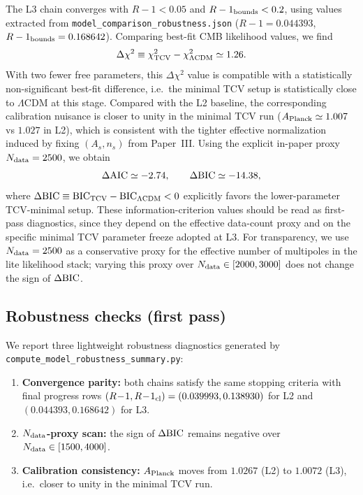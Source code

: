 \documentclass[aps,prd,onecolumn,nofootinbib,superscriptaddress]{revtex4-2}
\begin{document}
The L3 chain converges with $R-1<0.05$ and $R-1_{\rm bounds}<0.2$,
using values extracted from
\texttt{model\_comparison\_robustness.json}
($R-1=0.044393$, $R-1_{\rm bounds}=0.168642$).
Comparing best-fit CMB likelihood values, we find
\begin{equation}
  \Delta\chi^2 \equiv \chi^2_{\rm TCV} - \chi^2_{\Lambda{\rm CDM}}
  \simeq 1.26.
\end{equation}
With two fewer free parameters, this $\Delta\chi^2$ value is compatible with a
statistically non-significant best-fit difference, i.e.\ the minimal TCV setup
is statistically close to $\Lambda$CDM at this stage.
Compared with the L2 baseline, the corresponding calibration nuisance is
closer to unity in the minimal TCV run ($A_{\rm Planck}\simeq 1.007$ vs
$1.027$ in L2), which is consistent with the tighter effective normalization
induced by fixing $(A_s,n_s)$ from Paper~III.
Using the explicit in-paper proxy $N_{\rm data}=2500$, we obtain
\begin{equation}
  \Delta{\rm AIC}\simeq -2.74,\qquad
  \Delta{\rm BIC}\simeq -14.38,
\end{equation}
where $\Delta{\rm BIC}\equiv{\rm BIC}_{\rm TCV}-{\rm BIC}_{\Lambda{\rm CDM}}<0$
explicitly favors the lower-parameter TCV-minimal setup.
These information-criterion values should be read as first-pass diagnostics,
since they depend on the effective data-count proxy and on the specific minimal
TCV parameter freeze adopted at L3.
For transparency, we use $N_{\rm data}=2500$ as a conservative proxy for the
effective number of multipoles in the lite likelihood stack; varying this proxy
over $N_{\rm data}\in[2000,3000]$ does not change the sign of $\Delta{\rm BIC}$.

\subsection*{Robustness checks (first pass)}
We report three lightweight robustness diagnostics generated by
\texttt{compute\_model\_robustness\_summary.py}:
\begin{enumerate}[label=(R\arabic*)]
  \item \textbf{Convergence parity:} both chains satisfy the same stopping
  criteria with final progress rows
  $(R\!-\!1,R\!-\!1_{\rm cl})=(0.039993,0.138930)$ for L2 and
  $(0.044393,0.168642)$ for L3.
  \item \textbf{$N_{\rm data}$-proxy scan:} the sign of $\Delta{\rm BIC}$ remains
  negative over $N_{\rm data}\in[1500,4000]$.
  \item \textbf{Calibration consistency:} $A_{\rm Planck}$ moves from
  $1.0267$ (L2) to $1.0072$ (L3), i.e.\ closer to unity in the minimal TCV run.
\end{enumerate}
\end{document}
